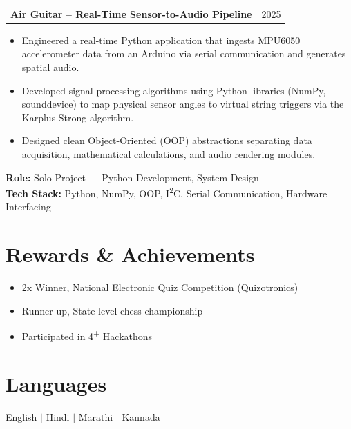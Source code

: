 \documentclass[letterpaper,10pt]{article}
\makeatletter
\newcommand{\resumeItemListStart}{\begin{itemize}[leftmargin=0.18in, topsep=1.5pt, parsep=0pt, itemsep=1pt]}
\newcommand{\resumeItemListEnd}{\end{itemize}\vspace{-4pt}}
\newcommand{\resumeItem}[1]{\item\small{#1}}
\newcommand{\resumeProjectHeading}[2]{
  \vspace{-1pt}
  \begin{tabular*}{\textwidth}[t]{l@{\extracolsep{\fill}}r}
    \textbf{#1} & #2 \\
  \end{tabular*}\vspace{-4pt}
}
\makeatother
\begin{document}
\vspace{3pt}

\resumeProjectHeading
  {\href{https://github.com/AdityaMittha/Air_guitar}{\textbf{Air Guitar -- Real-Time Sensor-to-Audio Pipeline}}}{2025}
\resumeItemListStart
  \resumeItem{Engineered a real-time Python application that ingests MPU6050 accelerometer data from an Arduino via serial communication and generates spatial audio.}
  \resumeItem{Developed signal processing algorithms using Python libraries (NumPy, sounddevice) to map physical sensor angles to virtual string triggers via the Karplus-Strong algorithm.}
  \resumeItem{Designed clean Object-Oriented (OOP) abstractions separating data acquisition, mathematical calculations, and audio rendering modules.}
\resumeItemListEnd
\small{\textbf{Role:} Solo Project --- Python Development, System Design} \\
\small{\textbf{Tech Stack:} Python, NumPy, OOP, I\textsuperscript{2}C, Serial Communication, Hardware Interfacing}

\vspace{-2pt}

\section{Rewards \& Achievements}
\resumeItemListStart
  \resumeItem{2x Winner, National Electronic Quiz Competition (Quizotronics)}
  \resumeItem{Runner-up, State-level chess championship}
  \resumeItem{Participated in 4\textsuperscript{+} Hackathons}
\resumeItemListEnd

\vspace{-4pt}

\section{Languages}
\small
English \enspace $|$ \enspace Hindi \enspace $|$ \enspace Marathi \enspace $|$ \enspace Kannada
\end{document}
